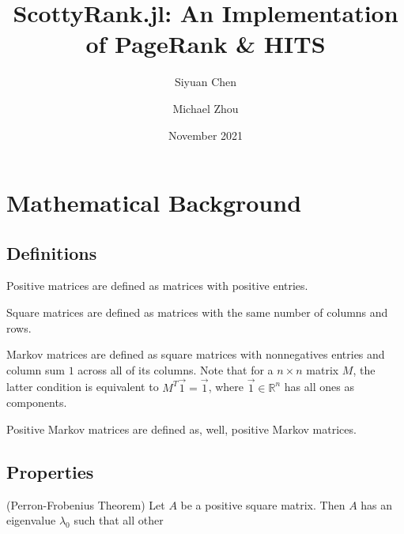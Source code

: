 \documentclass[12pt, titlepage, twoside]{amsart}
\newcommand{\R}{\ensuremath{\mathbb R}}
\begin{document}
\title[ScottyRank.jl]{ScottyRank.jl: An Implementation of PageRank \& HITS}

\author{Siyuan Chen}
\author{Michael Zhou}
\date{November 2021}

\maketitle

\section{Mathematical Background}

\subsection{Definitions}

Positive matrices are defined as matrices with positive entries.

Square matrices are defined as matrices with the same number of columns and rows.

Markov matrices are defined as square matrices with nonnegatives entries and column sum $1$ across all of its columns.
Note that for a $n\times n$ matrix $M$, the latter condition is equivalent to $M^T\vec{1} = \vec{1}$,
where $\vec{1}\in\R^n$ has all ones as components.

Positive Markov matrices are defined as, well, positive Markov matrices.

\subsection{Properties}


(Perron-Frobenius Theorem)
Let $A$ be a positive square matrix.
Then $A$ has an eigenvalue $\lambda_0$ such that all other 
\end{document}
